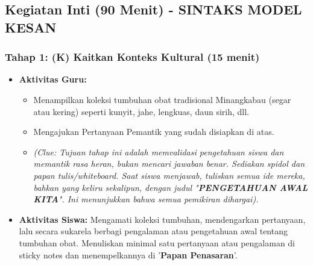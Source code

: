 \documentclass[a4paper,12pt]{article}
\begin{document}
\subsection{Kegiatan Inti (90 Menit) - SINTAKS MODEL KESAN}

\subsubsection{Tahap 1: (K) Kaitkan Konteks Kultural (15 menit)}
\begin{itemize}
\item \textbf{Aktivitas Guru:}
    \begin{itemize}
    \item Menampilkan koleksi tumbuhan obat tradisional Minangkabau (segar atau kering) seperti kunyit, jahe, lengkuas, daun sirih, dll.
    \item Mengajukan Pertanyaan Pemantik yang sudah disiapkan di atas.
    \item \textit{(Clue: Tujuan tahap ini adalah memvalidasi pengetahuan siswa dan memantik rasa heran, bukan mencari jawaban benar. Sediakan spidol dan papan tulis/whiteboard. Saat siswa menjawab, tuliskan semua ide mereka, bahkan yang keliru sekalipun, dengan judul "\textbf{PENGETAHUAN AWAL KITA}". Ini menunjukkan bahwa semua pemikiran dihargai).}
    \end{itemize}
\item \textbf{Aktivitas Siswa:} Mengamati koleksi tumbuhan, mendengarkan pertanyaan, lalu secara sukarela berbagi pengalaman atau pengetahuan awal tentang tumbuhan obat. Menuliskan minimal satu pertanyaan atau pengalaman di sticky notes dan menempelkannya di '\textbf{Papan Penasaran}'.
\end{itemize}
\end{document}
